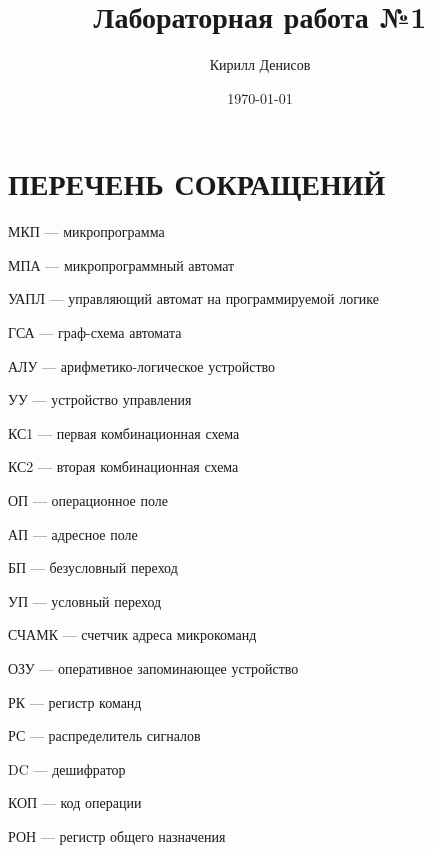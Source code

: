 \documentclass[a4paper,14pt]{extarticle}
\author{Кирилл Денисов}
\title{Лабораторная работа №1}
\date{\today}
\newcommand{\pathToCommonFolder}{/home/denilai/Documents/repos/latex/Common}
\def\myformat#1{\hfil #1\hfil}
\begin{document}
	\thispagestyle{empty}
	
	\newpage
	\newpage

	\section*{\myformat{ПЕРЕЧЕНЬ СОКРАЩЕНИЙ}}
	МКП --- микропрограмма
	
	МПА --- микропрограммный автомат
	
	УАПЛ --- управляющий автомат на программируемой логике
	
	ГСА --- граф-схема автомата
	
	АЛУ --- арифметико-логическое устройство
	
	УУ --- устройство управления
	
	КС1 --- первая комбинационная схема 
	
	КС2 --- вторая комбинационная схема 
	
	ОП --- операционное поле
	
	АП --- адресное поле 
	
	БП --- безусловный переход
	
	УП --- условный переход
	
	
	
	
	
	СЧАМК --- счетчик адреса микрокоманд
	
	ОЗУ  --- оперативное запоминающее устройство
	
	
	
	
	РК  --- регистр команд
	
	РС  --- распределитель сигналов
	
	DC  --- дешифратор
	
	
	КОП --- код операции
	
	
	
	
	РОН --- регистр общего назначения
	
\end{document}
